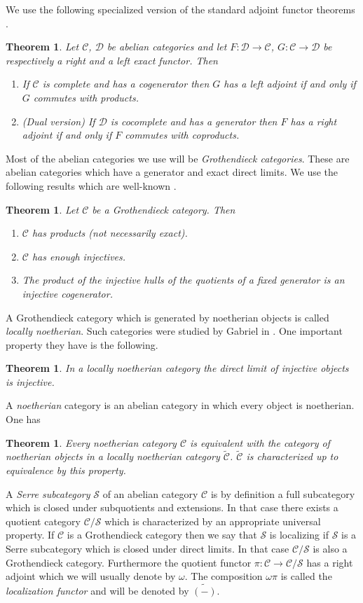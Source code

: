 \documentclass{amsproc}
\def\Cscr{{\mathcal C}}
\def\Dscr{{\mathcal D}}
\def\Sscr{{\mathcal S}}
\def\r{\rightarrow}
\newtheorem{theorem}[lemma]{Theorem}
\theoremstyle{definition}
\theoremstyle{remark}
\numberwithin{equation}{section}
\numberwithin{table}{section}
\numberwithin{figure}{section}
\begin{document}
We  use the following specialized version of the standard
adjoint functor theorems \cite{ML}.
\begin{theorem} 
\label{ref:2.1b}
Let $\Cscr$, $\Dscr$ be abelian categories and let $F:\Dscr\r\Cscr$,
$G:\Cscr\r\Dscr$ be respectively a right and a left exact functor.
Then
\begin{enumerate}
\item If $\Cscr$ is complete and has a
  cogenerator then $G$ has a left adjoint if and only if $G$ commutes
  with products.
\item (Dual version)  If  $\Dscr$ is cocomplete  and
has a generator then $F$ has a right adjoint if and only if $F$ commutes
with coproducts.
\end{enumerate}
\end{theorem}
Most of the abelian categories we use will be \emph{Grothendieck
  categories}. These are abelian categories which have a generator and
exact direct limits. We use the following results which are well-known
\cite{Groth1,stenstrom}.
\begin{theorem} Let $\Cscr$ be a Grothendieck category. Then
\begin{enumerate}
\item $\Cscr$ has products (not necessarily exact).
\item $\Cscr$ has enough injectives.
\item The product of the injective hulls of the quotients of a fixed
  generator is an injective cogenerator.
\end{enumerate}
\end{theorem}
A Grothendieck category which is generated by noetherian objects is
called \emph{locally noetherian}. Such categories were studied by
Gabriel in \cite{Gabriel}. One important property they have is the
following.
\begin{theorem}
  In a locally noetherian category the direct limit of injective
  objects is injective.
\end{theorem}
A \emph{noetherian} category is an abelian category in
which every object is noetherian. One has \cite[III, Th 1]{Gabriel}
\begin{theorem} Every noetherian category $\Cscr$ is equivalent
  with the category of noetherian objects in a locally noetherian
  category $\tilde{\Cscr}$.  $\tilde{\Cscr}$ is
   characterized up to equivalence by this property.
\end{theorem}
A \emph{Serre subcategory} $\Sscr$ of an abelian category $\Cscr$ is
by definition a full subcategory which is closed under subquotients
and extensions. In that case there exists a quotient category
$\Cscr/\Sscr$ which is characterized by an appropriate universal
property. If $\Cscr$ is a Grothendieck category  then we say that
$\Sscr$ is localizing if $\Sscr$ is a Serre subcategory which is
closed under direct limits. In that case $\Cscr/\Sscr$ is also a
Grothendieck category. Furthermore the quotient functor $\pi:\Cscr\r
\Cscr/\Sscr$ has a right adjoint which we will usually denote by
$\omega$. The composition $\omega\pi$ is called the \emph{localization
  functor} and will be denoted by $\tilde{(-)}$.
\end{document}
